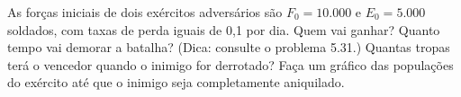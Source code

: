 As forças iniciais de dois exércitos adversários são $F_0 = 10.000$ e $E_0 = 5.000$ soldados, com taxas de perda iguais de 0,1 por dia. Quem vai ganhar? Quanto tempo vai demorar a batalha? (Dica: consulte o problema 5.31.) Quantas tropas terá o vencedor quando o inimigo for derrotado? Faça um gráfico das populações do exército até que o inimigo seja completamente aniquilado.
